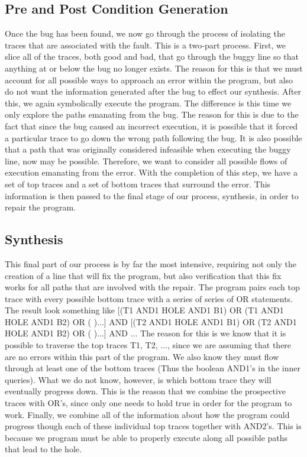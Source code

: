 \documentclass[]{article}
\begin{document}
\subsection{Pre and Post Condition Generation}
Once the bug has been found, we now go through the process of isolating the
traces that are associated with the fault.  This is a two-part process.
First, we slice all of the traces, both good and bad, that go through the buggy
line so that anything at or below the bug no longer exists.  The reason for
this is that we must account for all possible ways to approach an error
within the program, but also do not want the information generated after the
bug to effect our synthesis.  After this, we again symbolically execute
the program. The difference is this time we only explore the paths emanating from the bug.
The reason for this is due to the fact that since the bug caused an
incorrect execution, it is possible that it forced a particular trace to go
down the wrong path following the bug.  It is also possible that a path that
was originally considered infeasible when executing the buggy line, now may be
possible.  Therefore, we want to consider all possible flows of execution
emanating from the error.  With the completion of this step, we have a set
of top traces and a set of bottom traces that surround the error.  This
information is then passed to the final stage of our process, synthesis, in
order to repair the program.

\subsection{Synthesis}
This final part of our process is by far the most intensive, requiring not
only the creation of a line that will fix the program, but also verification
that this fix works for all paths that are involved with the repair.  The
program pairs each top trace with every possible bottom trace with a series
of series of OR statements.  The result look something like [(T1 AND1 HOLE
AND1 B1) OR (T1 AND1 HOLE AND1 B2) OR ( )...] AND  [(T2 AND1 HOLE AND1 B1)
OR (T2 AND1 HOLE AND1 B2) OR ( )...] AND ... The reason for this is we know
that it is possible to traverse the top traces T1, T2, ..., since we are
assuming that there are no errors within this part of the program.  We also
know they must flow through at least one of the bottom traces (Thus the
boolean AND1's in the inner queries).  What we do not know, however, is
which bottom trace they will eventually progress down.  This is the reason
that we combine the prospective traces with OR's, since only one needs to
hold true in order for the program to work.  Finally, we combine all of the
information about how the program could progress though each of these
individual top traces together with AND2's.  This is because we program must
be able to properly execute along all possible paths that lead to the hole.
\end{document}
